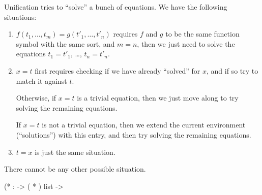 \begin{node}
Unification tries to ``solve'' a bunch of equations. We have the
following situations:
\begin{enumerate}
\item $f(t_{1},\dots,t_{m})=g(t'_{1},\dots,t'_{n})$ requires $f$ and
  $g$ to be the same function symbol with the same sort, and $m=n$,
  then we just need to solve the equations $t_{1}=t'_{1}$, \dots, $t_{n}=t'_{n}$.
\item $x=t$ first requires checking if we have already ``solved'' for
  $x$, and if so try to match it against $t$.

  Otherwise, if $x=t$ is a trivial equation, then we just move along
  to try solving the remaining equations.

  If $x=t$ is not a trivial equation, then we extend the current
  environment (``solutions'') with this entry, and then try solving
  the remaining equations.
\item $t=x$ is just the same situation.
\end{enumerate}
There cannot be any other possible situation.
\end{node}

\nwenddocs{}\endmoddef\nwstartdeflinemarkup{}\nwenddeflinemarkup
(*  :  -> ( * ) list -> 

